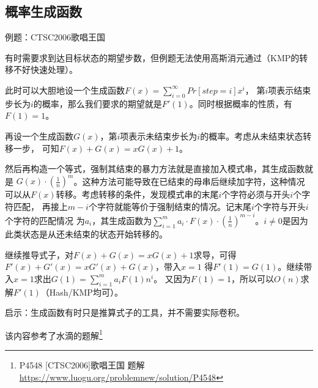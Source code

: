 \subsection{概率生成函数}
例题：CTSC2006歌唱王国

有时需要求到达目标状态的期望步数，但例题无法使用高斯消元通过（KMP的转移不好快速处理）。

此时可以大胆地设一个生成函数$F(x)=\displaystyle \sum_{i=0}^\infty{Pr[step=i]x^i}$，
第$i$项表示结束步长为$i$的概率，那么我们要求的期望就是$F'(1)$。同时根据概率的性质，有
$F(1)=1$。

再设一个生成函数$G(x)$，第$i$项表示未结束步长为$i$的概率。考虑从未结束状态转移一步，
可知$F(x)+G(x)=xG(x)+1$。

然后再构造一个等式，强制其结束的暴力方法就是直接加入模式串，其生成函数就是
$G(x)\cdot (\frac{1}{n})^m$。这种方法可能导致在已结束的母串后继续加字符，这种情况
可以从$F(x)$转移。考虑转移的条件，发现模式串的末尾$i$个字符必须与开头$i$个字符匹配，
再接上$m-i$个字符就能等价于强制结束的情况。记末尾$i$个字符与开头$i$个字符的匹配情况
为$a_i$，其生成函数为$\displaystyle \sum_{i=1}^m{a_i\cdot F(x)\cdot
 (\frac{1}{n})^{m-i}}$。$i\neq 0$是因为此类状态是从还未结束的状态开始转移的。

继续推导式子，对$F(x)+G(x)=xG(x)+1$求导，可得$F'(x)+G'(x)=xG'(x)+G(x)$，带入$x=1$
得$F'(1)=G(1)$。继续带入$x=1$求出$G(1)=\displaystyle \sum_{i=1}^m{a_iF(1)n^i}$。
又因为$F(1)=1$，所以可以$O(n)$求解$F'(1)$（Hash/KMP均可）。

启示：生成函数有时只是推算式子的工具，并不需要实际卷积。

该内容参考了水滴的题解\footnote{
	P4548 [CTSC2006]歌唱王国 题解\\
	\url{https://www.luogu.org/problemnew/solution/P4548}
}
